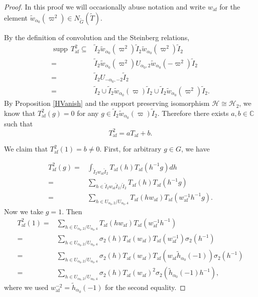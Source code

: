 \documentclass[10pt, letterpaper]{amsart}
\theoremstyle{plain}
\theoremstyle{definition}
\numberwithin{equation}{section}
\newcommand{\wt}{\tilde{w}}
\newcommand{\htt}{\tilde{h}}
\newcommand{\Gt}{\widetilde{G}}
\newcommand{\It}{\widetilde{I}}
\newcommand{\Tt}{\widetilde{T}}
\newcommand{\supp}{\operatorname{supp}}
\newcommand{\af}{\mathrm{af}}
\newcommand{\Hcal}{\mathcal{H}}
\begin{document}
\begin{proof}
In this proof we will occasionally abuse notation and write $w_{\af}$ for the element $\wt_{\alpha_0}(\varpi^2)\in N_{\Gt}(\Tt)$.
 
By the definition of convolution and the Steinberg relations, 
	\begin{align*}
		\supp \,T_{\af}^{2}\subseteq&  \It_2\wt_{\alpha_{0}}(\varpi^{2}) \It_2\wt_{\alpha_{0}}(\varpi^{2}) \It_2\\
		=& \It_2\wt_{\alpha_{0}}(\varpi^{2})U_{\alpha_{0},2}\wt_{\alpha_{0}}(-\varpi^{2}) \It_2\\
		=& \It_2U_{-\alpha_{0},-2} \It_2\\
		=& \It_2\cup \It_2\wt_{\alpha_{0}}(\varpi) \It_2\cup \It_2\wt_{\alpha_{0}}(\varpi^{2}) \It_2.
	\end{align*}
    By Proposition \ref{HVanish} and the support preserving isomorphism $\Hcal\cong \Hcal_{2}$, we know that $T_{\af}^{2}(g)=0$ for any $g\in \It_2\wt_{\alpha_{0}}(\varpi) \It_2$. Therefore there exists $a,b\in\mathbb{C}$ such that
	\begin{equation*}
		T_{\af}^{2}=aT_{\af}+b.
	\end{equation*}
	
	We claim that $T_{\af}^{2}(1)=b\neq 0$. First, for arbitrary $g\in G$, we have
	
	\begin{align*}
		T_{\af}^{2}(g)=&\int_{\It_2w_{\af}\It_2}T_{\af}(h)T_{\af}(h^{-1}g)dh\\
		=&\sum_{h\in\It_2w_{\af}\It_2/\It_2}T_{\af}(h)T_{\af}(h^{-1}g)\\
		=&\sum_{h\in U_{\alpha_{0},2}/U_{\alpha_{0},4}}T_{\af}(hw_{\af})T_{\af}(w_{\af}^{-1}h^{-1}g).
	\end{align*}
	Now we take $g=1$. Then
	\begin{align*}
		T_{\af}^{2}(1)=&\sum_{h\in U_{\alpha_{0},2}/U_{\alpha_{0},4}}T_{\af}(hw_{\af})T_{\af}(w_{\af}^{-1}h^{-1})\\
		=&\sum_{h\in U_{\alpha_{0},2}/U_{\alpha_{0},4}}\sigma_{2}(h)T_{\af}(w_{\af})T_{\af}(w_{\af}^{-1})\sigma_{2}(h^{-1})\\
        =& \sum_{h\in U_{\alpha_{0},2}/U_{\alpha_{0},4}}\sigma_{2}(h)T_{\af}(w_{\af})T_{\af}(w_{\af}\htt_{\alpha_{0}}(-1))\sigma_{2}(h^{-1})\\
        =&\sum_{h\in U_{\alpha_{0},2}/U_{\alpha_{0},4}}\sigma_{2}(h)T_{\af}(w_{\af})^{2}\sigma_{2}(\htt_{\alpha_{0}}(-1)h^{-1}),
	\end{align*}
    where we used $w_{\af}^{-2}=\htt_{\alpha_{0}}(-1)$ for the second equality.
    

\end{proof}
\end{document}
